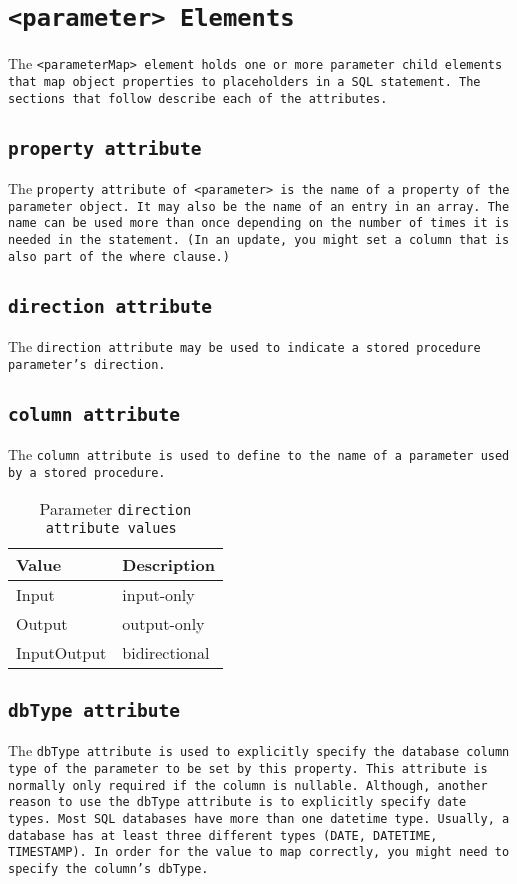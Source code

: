 \section{\tt{<parameter>} Elements}
The \tt{<parameterMap>} element holds one or more parameter child elements
that map object properties to placeholders in a SQL statement. The sections
that follow describe each of the attributes.

\subsection{\tt{property} attribute}
The \tt{property} attribute of \tt{<parameter>} is the name of a property of
the parameter object. It may also be the name of an entry in an array. The
name can be used more than once depending on the number of times it is needed
in the statement. (In an update, you might set a column that is also part of
the where clause.)

\subsection{\tt{direction} attribute}
The \tt{direction} attribute may be used to indicate a stored procedure
parameter's direction.

\subsection{\tt{column} attribute}
The \tt{column} attribute is used to define to the name of a parameter used by
a stored procedure.

\begin{table}[!h]\centering\label{table:3.3}
\caption{Parameter \tt{direction} attribute values }
\begin{tabular}{|l|l|}
  \hline
  \textbf{Value} & \textbf{Description}\\
  \hline
  Input & input-only \\
  \hline
  Output & output-only \\
  \hline
  InputOutput & bidirectional \\
  \hline
\end{tabular}
\end{table}

\subsection{\tt{dbType} attribute}
The \tt{dbType} attribute is used to explicitly specify the database column
type of the parameter to be set by this property. This attribute is normally
only required if the column is nullable. Although, another reason to use the
\tt{dbType} attribute is to explicitly specify date types. Most SQL databases
have more than one \tt{datetime} type. Usually, a database has at least three
different types (DATE, DATETIME, TIMESTAMP). In order for the value to map
correctly, you might need to specify the column's \tt{dbType}.

